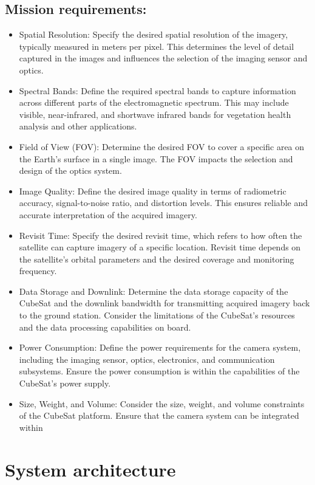 \documentclass[]{article}
\begin{document}
\subsection{Mission requirements:}
	\begin{itemize}
		\item Spatial Resolution: Specify the desired spatial resolution of the imagery, typically measured in meters per pixel. This determines the level of detail captured in the images and influences the selection of the imaging sensor and optics.
		\item  Spectral Bands: Define the required spectral bands to capture information across different parts of the electromagnetic spectrum. This may include visible, near-infrared, and shortwave infrared bands for vegetation health analysis and other applications.
		\item  Field of View (FOV): Determine the desired FOV to cover a specific area on the Earth's surface in a single image. The FOV impacts the selection and design of the optics system.
		\item  Image Quality: Define the desired image quality in terms of radiometric accuracy, signal-to-noise ratio, and distortion levels. This ensures reliable and accurate interpretation of the acquired imagery.
		\item  Revisit Time: Specify the desired revisit time, which refers to how often the satellite can capture imagery of a specific location. Revisit time depends on the satellite's orbital parameters and the desired coverage and monitoring frequency.
		\item Data Storage and Downlink: Determine the data storage capacity of the CubeSat and the downlink bandwidth for transmitting acquired imagery back to the ground station. Consider the limitations of the CubeSat's resources and the data processing capabilities on board.
		\item  Power Consumption: Define the power requirements for the camera system, including the imaging sensor, optics, electronics, and communication subsystems. Ensure the power consumption is within the capabilities of the CubeSat's power supply.
		\item Size, Weight, and Volume: Consider the size, weight, and volume constraints of the CubeSat platform. Ensure that the camera system can be integrated within
	\end{itemize}
\section{System architecture}
\end{document}

